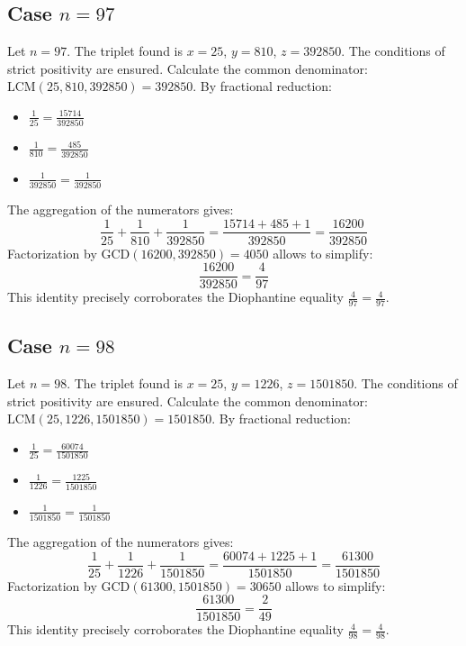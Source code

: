 \documentclass[11pt,a4paper]{article}
\begin{document}
\subsection{Case $n = 97$}
Let $n = 97$. The triplet found is $x = 25$, $y = 810$, $z = 392850$.
The conditions of strict positivity are ensured.
Calculate the common denominator: $\text{LCM}(25, 810, 392850) = 392850$.
By fractional reduction:
\begin{itemize}
    \item $\frac{1}{25} = \frac{15714}{392850}$
    \item $\frac{1}{810} = \frac{485}{392850}$
    \item $\frac{1}{392850} = \frac{1}{392850}$
\end{itemize}
The aggregation of the numerators gives:
$$ \frac{1}{25} + \frac{1}{810} + \frac{1}{392850} = \frac{15714 + 485 + 1}{392850} = \frac{16200}{392850} $$
Factorization by $\text{GCD}(16200, 392850) = 4050$ allows to simplify:
$$ \frac{16200}{392850} = \frac{4}{97} $$
This identity precisely corroborates the Diophantine equality $\frac{4}{97} = \frac{4}{97}$.

\subsection{Case $n = 98$}
Let $n = 98$. The triplet found is $x = 25$, $y = 1226$, $z = 1501850$.
The conditions of strict positivity are ensured.
Calculate the common denominator: $\text{LCM}(25, 1226, 1501850) = 1501850$.
By fractional reduction:
\begin{itemize}
    \item $\frac{1}{25} = \frac{60074}{1501850}$
    \item $\frac{1}{1226} = \frac{1225}{1501850}$
    \item $\frac{1}{1501850} = \frac{1}{1501850}$
\end{itemize}
The aggregation of the numerators gives:
$$ \frac{1}{25} + \frac{1}{1226} + \frac{1}{1501850} = \frac{60074 + 1225 + 1}{1501850} = \frac{61300}{1501850} $$
Factorization by $\text{GCD}(61300, 1501850) = 30650$ allows to simplify:
$$ \frac{61300}{1501850} = \frac{2}{49} $$
This identity precisely corroborates the Diophantine equality $\frac{4}{98} = \frac{4}{98}$.
\end{document}
